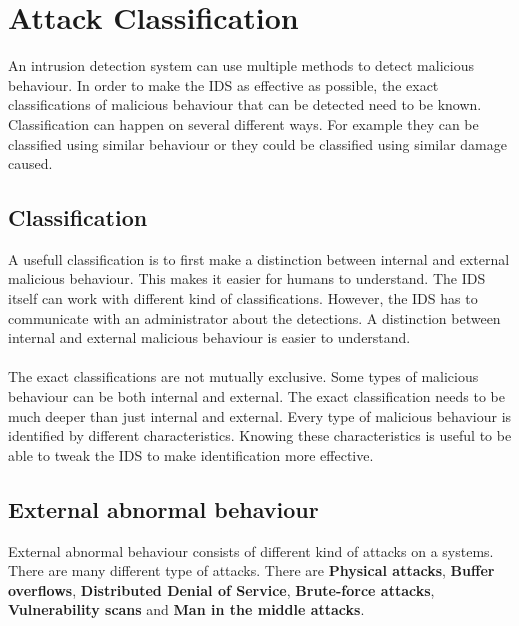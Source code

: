 
\chapter{Attack Classification} %

\label{attack} %

An intrusion detection system can use multiple methods to detect malicious behaviour. In order to make the IDS as effective as possible, the exact classifications of malicious behaviour that can be detected need to be known. Classification can happen on several different ways. For example they can be classified using similar behaviour or they could be classified using similar damage caused. \cite{paulauskas2015computer}

\section{Classification}
A usefull classification is to first make a distinction between internal and external malicious behaviour. This makes it easier for humans to understand. The IDS itself can work with different kind of classifications. However, the IDS has to communicate with an administrator about the detections. A distinction between internal and external malicious behaviour is easier to understand. \\\\
The exact classifications are not mutually exclusive. Some types of malicious behaviour can be both internal and external. The exact classification needs to be much deeper than just internal and external. Every type of malicious behaviour is identified by different characteristics. Knowing these characteristics is useful to be able to tweak the IDS to make identification more effective. \cite{hansman2005taxonomy}

\section{External abnormal behaviour}
External abnormal behaviour consists of different kind of attacks on a systems. There are many different type of attacks. There are \textbf{Physical attacks}, \textbf{Buffer overflows}, \textbf{Distributed Denial of Service}, \textbf{Brute-force attacks}, \textbf{Vulnerability scans} and \textbf{Man in the middle attacks}. 


